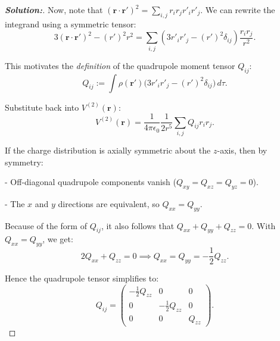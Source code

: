 \documentclass[12pt]{article}
\theoremstyle{definition}\newtheorem{problem}{Problem}
\newenvironment{solution}{\begin{proof}[\bfseries\textup{Solution:}]}{\end{proof}}
\begin{document}
\begin{solution}
    Now, note that $(\mathbf{r}\cdot\mathbf{r}')^2 = \sum_{i,j}r_i r_j r'_i r'_j$. We can rewrite the integrand using a symmetric tensor:
    \[
    3(\mathbf{r}\cdot\mathbf{r}')^2 - (r')^2 r^2 = \sum_{i,j} (3r'_i r'_j - (r')^2\delta_{ij})\frac{r_i r_j}{r^2}.
    \]
    
    This motivates the \textit{definition} of the quadrupole moment tensor $Q_{ij}$:
    \[
    Q_{ij} := \int \rho(\mathbf{r}') \bigl(3 r'_i r'_j - (r')^2\delta_{ij}\bigr)\, d\tau.
    \]
    
    Substitute back into $V^{(2)}(\mathbf{r})$:
    \[
    V^{(2)}(\mathbf{r}) = \frac{1}{4\pi\epsilon_0}\frac{1}{2r^5}\sum_{i,j} Q_{ij} r_i r_j.
    \]
    
    If the charge distribution is axially symmetric about the $z$-axis, then by symmetry:

    - Off-diagonal quadrupole components vanish ($Q_{xy}=Q_{xz}=Q_{yz}=0$).

    - The $x$ and $y$ directions are equivalent, so $Q_{xx}=Q_{yy}$.
    
    Because of the form of $Q_{ij}$, it also follows that $Q_{xx}+Q_{yy}+Q_{zz}=0$. With $Q_{xx}=Q_{yy}$, we get:
    \[
    2Q_{xx}+Q_{zz}=0 \implies Q_{xx}=Q_{yy}=-\frac{1}{2}Q_{zz}.
    \]
    
    Hence the quadrupole tensor simplifies to:
    \[
    Q_{ij}=
    \begin{pmatrix}
    -\frac{1}{2}Q_{zz} & 0 & 0\\[6pt]
    0 & -\frac{1}{2}Q_{zz} & 0\\[6pt]
    0 & 0 & Q_{zz}
    \end{pmatrix}.
    \]

\end{solution}
\end{document}
